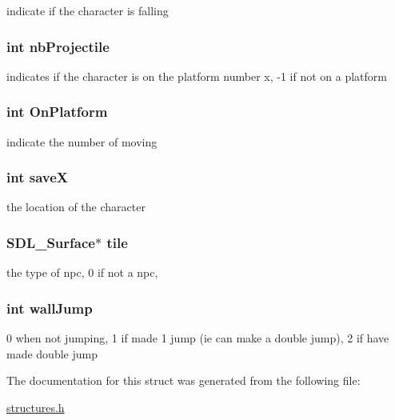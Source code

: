 indicate if the character is falling \hypertarget{struct_character_a803fd7edf0558a9e0dc73e6351ad85d0}{
\subsubsection[{nb\-Projectile}]{\setlength{\rightskip}{0pt plus 5cm}int nb\-Projectile}}\label{struct_character_a803fd7edf0558a9e0dc73e6351ad85d0}
indicates if the character is on the platform number x, -\/1 if not on a platform \hypertarget{struct_character_a6aa1000eea413726c603222d5d30fdfe}{
\subsubsection[{On\-Platform}]{\setlength{\rightskip}{0pt plus 5cm}int On\-Platform}}\label{struct_character_a6aa1000eea413726c603222d5d30fdfe}
indicate the number of moving \hypertarget{struct_character_a72c195fb4fffc6a9267fffce902bf641}{
\subsubsection[{save\-X}]{\setlength{\rightskip}{0pt plus 5cm}int save\-X}}\label{struct_character_a72c195fb4fffc6a9267fffce902bf641}
the location of the character \hypertarget{struct_character_a36a8f1f7bc9c241b9926d97b82811407}{
\subsubsection[{tile}]{\setlength{\rightskip}{0pt plus 5cm}S\-D\-L\-\_\-\-Surface$\ast$ tile}}\label{struct_character_a36a8f1f7bc9c241b9926d97b82811407}
the type of npc, 0 if not a npc, \hypertarget{struct_character_aa7fe887a46ee52d925d7b5871e78a202}{
\subsubsection[{wall\-Jump}]{\setlength{\rightskip}{0pt plus 5cm}int wall\-Jump}}\label{struct_character_aa7fe887a46ee52d925d7b5871e78a202}
0 when not jumping, 1 if made 1 jump (ie can make a double jump), 2 if have made double jump 

The documentation for this struct was generated from the following file\-:\begin{DoxyCompactItemize}
\item 
\hyperlink{structures_8h}{structures.\-h}\end{DoxyCompactItemize}
